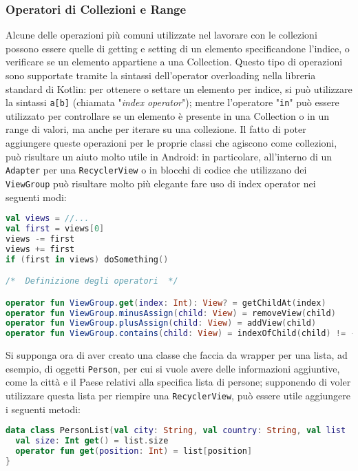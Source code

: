 \subsubsection{Operatori di Collezioni e Range}
Alcune delle operazioni più comuni utilizzate nel lavorare con le collezioni possono essere quelle di getting e setting di un elemento specificandone l'indice, o verificare se un elemento appartiene a una Collection. Questo tipo di operazioni sono supportate tramite la sintassi dell'operator overloading nella libreria standard di Kotlin: per ottenere o settare un elemento per indice, si può utilizzare la sintassi \texttt{a[b]} (chiamata "{\em index operator}"); mentre l'operatore "\texttt{in}" può essere utilizzato per controllare se un elemento è presente in una Collection o in un range di valori, ma anche per iterare su una collezione. Il fatto di poter aggiungere queste operazioni per le proprie classi che agiscono come collezioni, può risultare un aiuto molto utile in Android: in particolare, all'interno di un \texttt{Adapter} per una \texttt{RecyclerView} o in blocchi di codice che utilizzano dei \texttt{ViewGroup} può risultare molto più elegante fare uso di index operator nei seguenti modi:\\

\begin{lstlisting}[caption={Operator Overloading su \texttt{ViewGroup}}, captionpos=b, label={lst:exAmpleOpOvViewGroup}, language=Kotlin]
val views = //...
val first = views[0]
views -= first
views += first
if (first in views) doSomething()

/*  Definizione degli operatori  */

operator fun ViewGroup.get(index: Int): View? = getChildAt(index)
operator fun ViewGroup.minusAssign(child: View) = removeView(child)
operator fun ViewGroup.plusAssign(child: View) = addView(child)
operator fun ViewGroup.contains(child: View) = indexOfChild(child) != -1
\end{lstlisting}

Si supponga ora di aver creato una classe che faccia da wrapper per una lista, ad esempio, di oggetti \texttt{Person}, per cui si vuole avere delle informazioni aggiuntive, come la città e il Paese relativi alla specifica lista di persone; supponendo di voler utilizzare questa lista per riempire una \texttt{RecyclerView}, può essere utile aggiungere i seguenti metodi:\\

\begin{lstlisting}[caption={Definizione di operator functions per una \texttt{PersonList}}, captionpos=b, label={lst:exAmpleOpOvRecView}, language=Kotlin]
data class PersonList(val city: String, val country: String, val list : List<Person>) {
  val size: Int get() = list.size
  operator fun get(position: Int) = list[position]
}
\end{lstlisting}

